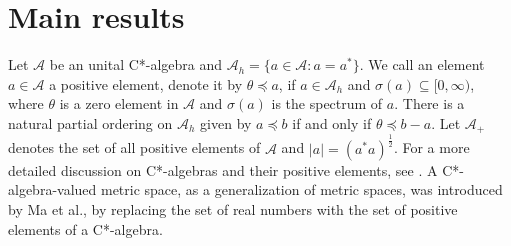 \documentclass{amsart}%
\theoremstyle{plain}
\numberwithin{equation}{section}
\begin{document}
\section{Main results}
Let $\mathcal{A}$ be an unital C*-algebra and $\mathcal{A}_h=\{a \in \mathcal{A} : a=a^*\}$. We call an element $a\in \mathcal{A}$ a positive element, denote it by $\theta \preceq a$, if $a\in \mathcal{A}_h$ and $\sigma(a)\subseteq [0,\infty)$, where $\theta$ is a zero element in $\mathcal{A}$ and $\sigma(a)$ is the spectrum of $a$. There is a natural partial ordering on $\mathcal{A}_h$ given by $a\preceq b$ if and only if $\theta\preceq b-a$. Let $\mathcal{A}_+$ denotes the set of all positive elements of $\mathcal{A}$ and $|a|=(a^*a)^{\frac{1}{2}}$. For a more detailed discussion on C*-algebras and their positive elements, see  \cite{Murphy,sakai2012c}.
A C*-algebra-valued metric space, as a generalization of metric spaces, was introduced by Ma et al., \cite{Z.H.Ma} by replacing the set of real numbers with the set of positive elements of a C*-algebra. 
\end{document}
